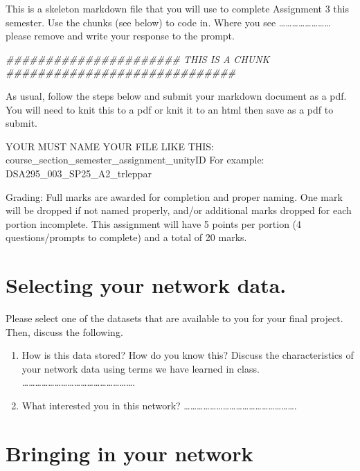 \documentclass[
  letterpaper,
  DIV=11,
  numbers=noendperiod]{scrreprt}
\newenvironment{Shaded}{\begin{snugshade}}{\end{snugshade}}
\newcommand{\DocumentationTok}[1]{\textcolor[rgb]{0.37,0.37,0.37}{\textit{#1}}}
\begin{document}
This is a skeleton markdown file that you will use to complete
Assignment 3 this semester. Use the chunks (see below) to code in. Where
you see \ldots\ldots\ldots\ldots\ldots\ldots\ldots\ldots{} please remove
and write your response to the prompt.

\begin{Shaded}
\begin{Highlighting}[]
\DocumentationTok{\#\#\#\#\#\#\#\#\#\#\#\#\#\#\#\#\#\#\#\#\#\# THIS IS A CHUNK \#\#\#\#\#\#\#\#\#\#\#\#\#\#\#\#\#\#\#\#\#\#\#\#\#\#\#\#\#}
\end{Highlighting}
\end{Shaded}

As usual, follow the steps below and submit your markdown document as a
pdf. You will need to knit this to a pdf or knit it to an html then save
as a pdf to submit.

YOUR MUST NAME YOUR FILE LIKE THIS:
course\_section\_semester\_assignment\_unityID For example:
DSA295\_003\_SP25\_A2\_trleppar

Grading: Full marks are awarded for completion and proper naming. One
mark will be dropped if not named properly, and/or additional marks
dropped for each portion incomplete. This assignment will have 5 points
per portion (4 questions/prompts to complete) and a total of 20 marks.

\section{Selecting your network
data.}\label{selecting-your-network-data.}

Please select one of the datasets that are available to you for your
final project. Then, discuss the following.

\begin{enumerate}
\def\labelenumi{\arabic{enumi})}
\item
  How is this data stored? How do you know this? Discuss the
  characteristics of your network data using terms we have learned in
  class.
  \ldots\ldots\ldots\ldots\ldots\ldots\ldots\ldots\ldots\ldots\ldots\ldots\ldots\ldots\ldots\ldots\ldots.
\item
  What interested you in this network?
  \ldots\ldots\ldots\ldots\ldots\ldots\ldots\ldots\ldots\ldots\ldots\ldots\ldots\ldots\ldots\ldots\ldots.
\end{enumerate}

\section{Bringing in your network}\label{bringing-in-your-network}
\end{document}
